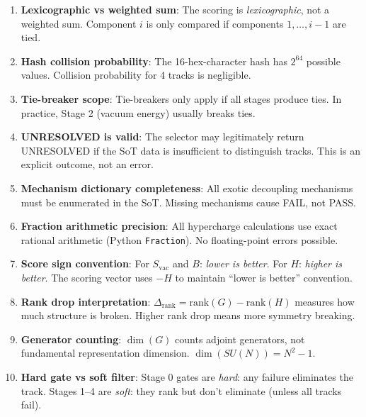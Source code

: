 \documentclass[11pt,a4paper]{article}
\begin{document}
\begin{enumerate}[label=\textbf{Trap \arabic*}, leftmargin=*]
\item \textbf{Lexicographic vs weighted sum}:
The scoring is \emph{lexicographic}, not a weighted sum. Component $i$ is only
compared if components $1, \ldots, i-1$ are tied.

\item \textbf{Hash collision probability}:
The 16-hex-character hash has $2^{64}$ possible values. Collision probability
for 4 tracks is negligible.

\item \textbf{Tie-breaker scope}:
Tie-breakers only apply if all stages produce ties. In practice, Stage 2
(vacuum energy) usually breaks ties.

\item \textbf{UNRESOLVED is valid}:
The selector may legitimately return UNRESOLVED if the SoT data is insufficient
to distinguish tracks. This is an explicit outcome, not an error.

\item \textbf{Mechanism dictionary completeness}:
All exotic decoupling mechanisms must be enumerated in the SoT. Missing
mechanisms cause FAIL, not PASS.

\item \textbf{Fraction arithmetic precision}:
All hypercharge calculations use exact rational arithmetic (Python \texttt{Fraction}).
No floating-point errors possible.

\item \textbf{Score sign convention}:
For $S_{\text{vac}}$ and $B$: \emph{lower is better}. For $H$: \emph{higher is better}.
The scoring vector uses $-H$ to maintain ``lower is better'' convention.

\item \textbf{Rank drop interpretation}:
$\Delta_{\text{rank}} = \text{rank}(G) - \text{rank}(H)$ measures how much structure
is broken. Higher rank drop means more symmetry breaking.

\item \textbf{Generator counting}:
$\dim(G)$ counts adjoint generators, not fundamental representation dimension.
$\dim(SU(N)) = N^2 - 1$.

\item \textbf{Hard gate vs soft filter}:
Stage 0 gates are \emph{hard}: any failure eliminates the track. Stages 1--4
are \emph{soft}: they rank but don't eliminate (unless all tracks fail).

\end{enumerate}

\end{document}
